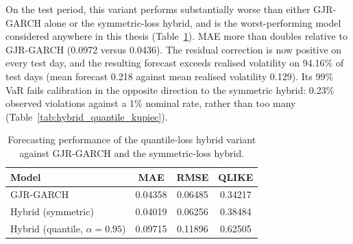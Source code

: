 \documentclass[12pt,a4paper]{article}
\begin{document}
On the test period, this variant performs substantially worse than either GJR-GARCH alone or the
symmetric-loss hybrid, and is the worst-performing model considered anywhere in this thesis
(Table~\ref{tab:hybrid_quantile_comparison}). MAE more than doubles relative to GJR-GARCH (0.0972
versus 0.0436). The residual correction is now positive on every test day, and the resulting
forecast exceeds realised volatility on 94.16\% of test days (mean forecast 0.218 against mean
realised volatility 0.129). Its 99\% VaR fails calibration in the opposite direction to the
symmetric hybrid: 0.23\% observed violations against a 1\% nominal rate, rather than too many
(Table~\ref{tab:hybrid_quantile_kupiec}).

\begin{table}[H]
\centering
\begin{tabular}{lccc}
\toprule
Model & MAE & RMSE & QLIKE \\
\midrule
GJR-GARCH & 0.04358 & 0.06485 & 0.34217 \\
Hybrid (symmetric) & 0.04019 & 0.06256 & 0.38484 \\
Hybrid (quantile, $\alpha=0.95$) & 0.09715 & 0.11896 & 0.62505 \\
\bottomrule
\end{tabular}
\caption{Forecasting performance of the quantile-loss hybrid variant against GJR-GARCH and the symmetric-loss hybrid.}
\label{tab:hybrid_quantile_comparison}
\end{table}

\begin{table}[H]
\centering
{}
\caption{Kupiec test results for GJR-GARCH and both hybrid variants.}
\label{tab:hybrid_quantile_kupiec}
\end{table}
\end{document}
